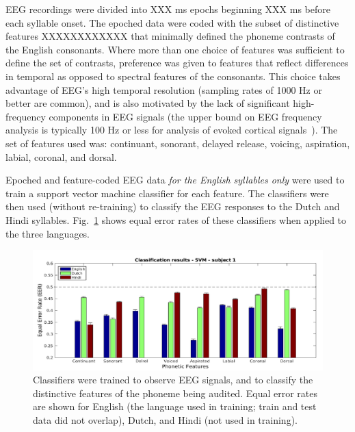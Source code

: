 EEG recordings were divided into XXX ms epochs beginning XXX ms before
each syllable onset.
The epoched data were coded with the subset of distinctive features XXXXXXXXXXXX
that minimally defined the phoneme contrasts of the English consonants.
Where more than one choice of features was sufficient to define the set
of contrasts, preference was given to features that reflect differences
in temporal as opposed to spectral features of the consonants. This
choice takes advantage of EEG's high temporal resolution (sampling
rates of 1000 Hz or better are common), and is also motivated by the
lack of significant high-frequency components in EEG signals (the upper
bound on EEG frequency analysis is typically 100 Hz or less for analysis
of evoked cortical signals~\cite{Luck05}). The set of features used was:
continuant, sonorant, delayed release, voicing, aspiration, labial,
coronal, and dorsal.

Epoched and feature-coded EEG data {\em for the English syllables only}
were used to train a support vector machine classifier for each feature.
The classifiers were then used (without re-training) to classify the
EEG responses to the Dutch and Hindi syllables.
Fig.~\ref{fig:eeg_svm_eers} shows equal error rates of these
classifiers when applied to the three languages.

\begin{figure}
  \centerline{\includegraphics[width=5in]{../figs/diliberto_svmresults.png}}
  \caption{Classifiers were trained to observe EEG signals, and to
    classify the distinctive features of the phoneme being audited.
    Equal error rates are shown for English (the language used in
    training; train and test data did not overlap), Dutch, and Hindi
    (not used in training).}
  \label{fig:eeg_svm_eers}
\end{figure}

